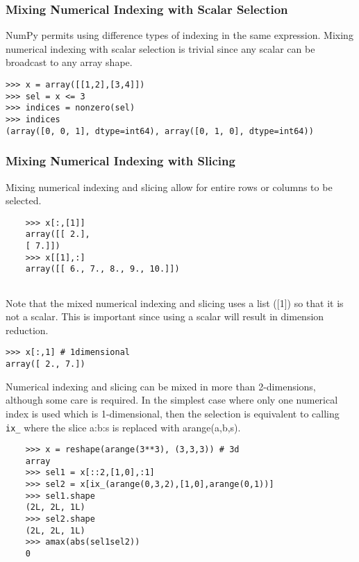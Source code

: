 \documentclass[KSmain.tex]{subfiles}
\begin{document}
\subsubsection*{Mixing Numerical Indexing with Scalar Selection}
NumPy permits using difference types of indexing in the same expression. Mixing numerical indexing
with scalar selection is trivial since any scalar can be broadcast to any array shape.


\begin{framed}
\begin{verbatim}
>>> x = array([[1,2],[3,4]])
>>> sel = x <= 3
>>> indices = nonzero(sel)
>>> indices
(array([0, 0, 1], dtype=int64), array([0, 1, 0], dtype=int64))
\end{verbatim}
\end{framed}

\subsubsection*{Mixing Numerical Indexing with Slicing}

Mixing numerical indexing and slicing allow for entire rows or columns to be selected.

\begin{framed}
	\begin{verbatim}
	>>> x[:,[1]]
	array([[ 2.],
	[ 7.]])
	>>> x[[1],:]
	array([[ 6., 7., 8., 9., 10.]])
	
	\end{verbatim}
\end{framed}

Note that the mixed numerical indexing and slicing uses a list ([1]) so that it is not a scalar. This is important
since using a scalar will result in dimension reduction.


\begin{framed}
	\begin{verbatim}
>>> x[:,1] # 1dimensional
array([ 2., 7.])
	\end{verbatim}
\end{framed}

Numerical indexing and slicing can be mixed in more than 2-dimensions, although some care is required.
In the simplest case where only one numerical index is used which is 1-dimensional, then the selection is
equivalent to calling \texttt{ix\_} where the slice a:b:s is replaced with arange(a,b,s).



\begin{framed}
	\begin{verbatim}
	>>> x = reshape(arange(3**3), (3,3,3)) # 3d
	array
	>>> sel1 = x[::2,[1,0],:1]
	>>> sel2 = x[ix_(arange(0,3,2),[1,0],arange(0,1))]
	>>> sel1.shape
	(2L, 2L, 1L)
	>>> sel2.shape
	(2L, 2L, 1L)
	>>> amax(abs(sel1sel2))
	0
	\end{verbatim}
\end{framed}
\end{document}
